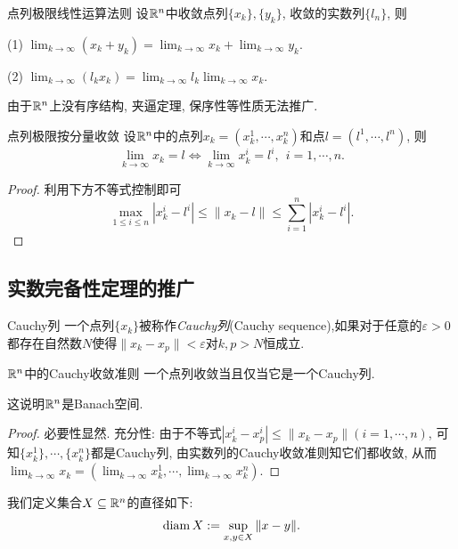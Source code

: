 \begin{proposition}{点列极限线性运算法则}
	设$\mathbb{R} ^n$中收敛点列$\{ x_k \},\{ y_k \}$, 收敛的实数列$\{ l_n \}$, 则
	
	(1) $\lim_{k\to \infty} (x_k+y_k) = \lim_{k\to \infty} x_k + \lim_{k\to \infty} y_k$. 
	
	(2) $\lim_{k\to \infty} (l_kx_k) = \lim_{k\to \infty} l_k \lim_{k\to \infty} x_k$. 
\end{proposition}

由于$\mathbb{R} ^n$上没有序结构, 夹逼定理, 保序性等性质无法推广. 

\begin{lemma}{点列极限按分量收敛}
	设$\mathbb{R} ^n$中的点列$x_k = (x^1_k, \cdots ,x_k^n)$和点$l=(l^1,\cdots ,l^n)$, 则$$\lim_{k\to \infty} x_k = l \Longleftrightarrow \lim_{k\to \infty} x^i_k = l^i,~~i=1,\cdots ,n. $$
\end{lemma}
\begin{proof}
	利用下方不等式控制即可$$\max_{1 \leq i \leq n} |x^i_k-l^i| \leq \| x_k-l \| \leq \sum_{i=1}^{n} |x^i_k-l^i|. $$
\end{proof}

\subsection{实数完备性定理的推广}

\begin{definition}{Cauchy列}
	一个点列$\{ x_k \}$被称作\textit{Cauchy列}(Cauchy sequence),如果对于任意的$\varepsilon >0$都存在自然数$N$使得$\| x_k-x_p \|<\varepsilon$对$k,p>N$恒成立.
\end{definition}

\begin{theorem}{$\mathbb{R} ^n$中的Cauchy收敛准则}
	一个点列收敛当且仅当它是一个Cauchy列.
\end{theorem}
\begin{remark}
	这说明$\mathbb{R} ^n$是Banach空间. 
\end{remark}
\begin{proof}
	必要性显然. 充分性: 由于不等式$|x^i_k - x^i_p| \leq \| x_k - x_p \|(i=1,\cdots ,n)$, 可知$\{ x^1_k \},\cdots ,\{ x^n_k \}$都是Cauchy列, 由实数列的Cauchy收敛准则知它们都收敛, 从而$\lim_{k\to \infty} x_k = (\lim_{k\to \infty} x^1_k,\cdots , \lim_{k\to \infty} x^n_k)$. 
\end{proof}

我们定义集合$X \subseteq \mathbb{R} ^n$的直径如下: $$\operatorname{diam} X := \sup_{x,y \in X} \| x-y \|. $$

